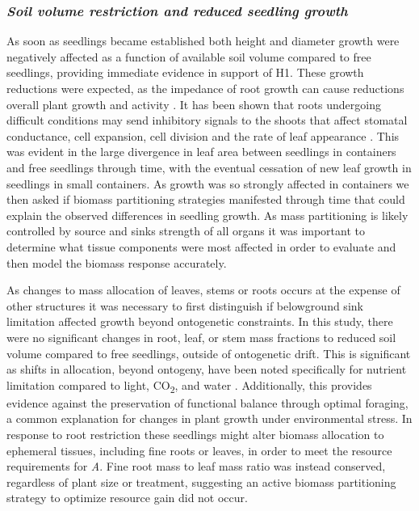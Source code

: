 \documentclass[a4paper]{article}\usepackage[]{graphicx}\usepackage[]{color}
\begin{document}
\subsubsection*{\textit{Soil volume restriction and reduced seedling growth}}

As soon as seedlings became established both height and diameter growth were negatively affected as a function of available soil volume compared to free seedlings, providing immediate evidence in support of H1. These growth reductions were expected, as the impedance of root growth can cause reductions overall plant growth and activity \citep{mcconnaughay1991physical, young1997mechanical}. It has been shown that roots undergoing difficult conditions may send inhibitory signals to the shoots that affect stomatal conductance, cell expansion, cell division and the rate of leaf appearance \citep{passioura2002soil}. This was evident in the large divergence in leaf area between seedlings in containers and free seedlings through time, with the eventual cessation of new leaf growth in seedlings in small containers. As growth was so strongly affected in containers we then asked if biomass partitioning strategies manifested through time that could explain the observed differences in seedling growth.	As mass partitioning is likely controlled by source and sinks strength of all organs \citep{poorter2012biomass} it was important to determine what tissue components were most affected in order to evaluate and then model the biomass response accurately.

As changes to mass allocation of leaves, stems or roots occurs at the expense of other structures \citep{mccarthy2007consistency} it was necessary to first distinguish if belowground sink limitation affected growth beyond ontogenetic constraints. In this study, there were no significant changes in root, leaf, or stem mass fractions to reduced soil volume compared to free seedlings, outside of ontogenetic drift. This is significant as shifts in allocation, beyond ontogeny, have been noted specifically for nutrient limitation compared to light, CO\textsubscript{2}, and water \citep[references therein]{mcconnaughay1999biomass}. Additionally, this provides evidence against the preservation of functional balance through optimal foraging, a common explanation for changes in plant growth under environmental stress. In response to root restriction these seedlings might alter biomass allocation to ephemeral tissues, including fine roots or leaves, in order to meet the resource requirements for \textit{A}. Fine root mass to leaf mass ratio was instead conserved, regardless of plant size or treatment, suggesting an active biomass partitioning strategy to optimize resource gain did not occur. 
\end{document}
